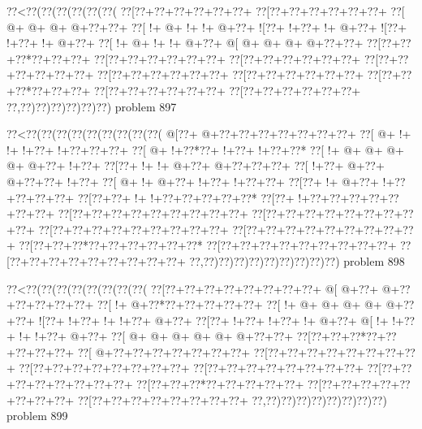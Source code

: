 \vbox{\vbox{\goo
\0??<\0??(\0??(\0??(\0??(\0??(\0??(
\0??[\0??+\0??+\0??+\0??+\0??+\0??+
\0??[\0??+\0??+\0??+\0??+\0??+\0??+
\0??[\- @+\- @+\- @+\- @+\0??+\0??+
\0??[\- !+\- @+\- !+\- !+\- @+\0??+
\- ![\0??+\- !+\0??+\- !+\- @+\0??+
\- ![\0??+\- !+\0??+\- !+\- @+\0??+
\0??[\- !+\- @+\- !+\- !+\- @+\0??+
\- @[\- @+\- @+\- @+\- @+\0??+\0??+
\0??[\0??+\0??+\0??*\0??+\0??+\0??+
\0??[\0??+\0??+\0??+\0??+\0??+\0??+
\0??[\0??+\0??+\0??+\0??+\0??+\0??+
\0??[\0??+\0??+\0??+\0??+\0??+\0??+
\0??[\0??+\0??+\0??+\0??+\0??+\0??+
\0??[\0??+\0??+\0??+\0??+\0??+\0??+
\0??[\0??+\0??+\0??*\0??+\0??+\0??+
\0??[\0??+\0??+\0??+\0??+\0??+\0??+
\0??[\0??+\0??+\0??+\0??+\0??+\0??+
\0??,\0??)\0??)\0??)\0??)\0??)\0??)
}
\hfil problem 897\hfil\break
}

\vbox{\vbox{\goo
\0??<\0??(\0??(\0??(\0??(\0??(\0??(\0??(\0??(\0??(
\- @[\0??+\- @+\0??+\0??+\0??+\0??+\0??+\0??+\0??+
\0??[\- @+\- !+\- !+\- !+\0??+\- !+\0??+\0??+\0??+
\0??[\- @+\- !+\0??*\0??+\- !+\0??+\- !+\0??+\0??*
\0??[\- !+\- @+\- @+\- @+\- @+\- @+\0??+\- !+\0??+
\0??[\0??+\- !+\- !+\- @+\0??+\- @+\0??+\0??+\0??+
\0??[\- !+\0??+\- @+\0??+\- @+\0??+\0??+\- !+\0??+
\0??[\- @+\- !+\- @+\0??+\- !+\0??+\- !+\0??+\0??+
\0??[\0??+\- !+\- @+\0??+\- !+\0??+\0??+\0??+\0??+
\0??[\0??+\0??+\- !+\- !+\0??+\0??+\0??+\0??+\0??*
\0??[\0??+\- !+\0??+\0??+\0??+\0??+\0??+\0??+\0??+
\0??[\0??+\0??+\0??+\0??+\0??+\0??+\0??+\0??+\0??+
\0??[\0??+\0??+\0??+\0??+\0??+\0??+\0??+\0??+\0??+
\0??[\0??+\0??+\0??+\0??+\0??+\0??+\0??+\0??+\0??+
\0??[\0??+\0??+\0??+\0??+\0??+\0??+\0??+\0??+\0??+
\0??[\0??+\0??+\0??*\0??+\0??+\0??+\0??+\0??+\0??*
\0??[\0??+\0??+\0??+\0??+\0??+\0??+\0??+\0??+\0??+
\0??[\0??+\0??+\0??+\0??+\0??+\0??+\0??+\0??+\0??+
\0??,\0??)\0??)\0??)\0??)\0??)\0??)\0??)\0??)\0??)
}
\hfil problem 898\hfil\break
}

\vbox{\vbox{\goo
\0??<\0??(\0??(\0??(\0??(\0??(\0??(\0??(\0??(
\0??[\0??+\0??+\0??+\0??+\0??+\0??+\0??+\0??+
\- @[\- @+\0??+\- @+\0??+\0??+\0??+\0??+\0??+
\0??[\- !+\- @+\0??*\0??+\0??+\0??+\0??+\0??+
\0??[\- !+\- @+\- @+\- @+\- @+\- @+\0??+\0??+
\- ![\0??+\- !+\0??+\- !+\- !+\0??+\- @+\0??+
\0??[\0??+\- !+\0??+\- !+\0??+\- !+\- @+\0??+
\- @[\- !+\- !+\0??+\- !+\- !+\0??+\- @+\0??+
\0??[\- @+\- @+\- @+\- @+\- @+\- @+\0??+\0??+
\0??[\0??+\0??+\0??*\0??+\0??+\0??+\0??+\0??+
\0??[\- @+\0??+\0??+\0??+\0??+\0??+\0??+\0??+
\0??[\0??+\0??+\0??+\0??+\0??+\0??+\0??+\0??+
\0??[\0??+\0??+\0??+\0??+\0??+\0??+\0??+\0??+
\0??[\0??+\0??+\0??+\0??+\0??+\0??+\0??+\0??+
\0??[\0??+\0??+\0??+\0??+\0??+\0??+\0??+\0??+
\0??[\0??+\0??+\0??*\0??+\0??+\0??+\0??+\0??+
\0??[\0??+\0??+\0??+\0??+\0??+\0??+\0??+\0??+
\0??[\0??+\0??+\0??+\0??+\0??+\0??+\0??+\0??+
\0??,\0??)\0??)\0??)\0??)\0??)\0??)\0??)\0??)
}
\hfil problem 899\hfil\break
}


